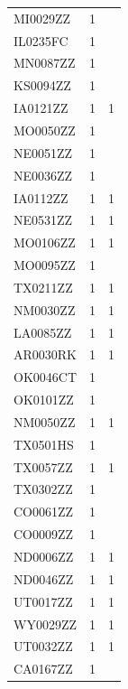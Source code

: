 \documentclass[12pt]{article}
\begin{document}
\begin{longtable}{lll}
MI0029ZZ         & 1             &          \\
IL0235FC         & 1             &          \\
MN0087ZZ         & 1             &          \\
KS0094ZZ         & 1             &          \\
IA0121ZZ         & 1             & 1        \\
MO0050ZZ         & 1             &          \\
NE0051ZZ         & 1             &          \\
NE0036ZZ         & 1             &          \\
IA0112ZZ         & 1             & 1        \\
NE0531ZZ         & 1             & 1        \\
MO0106ZZ         & 1             & 1        \\
MO0095ZZ         & 1             &          \\
TX0211ZZ         & 1             & 1        \\
NM0030ZZ         & 1             & 1        \\
LA0085ZZ         & 1             & 1        \\
AR0030RK         & 1             & 1        \\
OK0046CT         & 1             &          \\
OK0101ZZ         & 1             &          \\
NM0050ZZ         & 1             & 1        \\
TX0501HS         & 1             &          \\
TX0057ZZ         & 1             & 1        \\
TX0302ZZ         & 1             &          \\
CO0061ZZ         & 1             &          \\
CO0009ZZ         & 1             &          \\
ND0006ZZ         & 1             & 1        \\
ND0046ZZ         & 1             & 1        \\
UT0017ZZ         & 1             & 1        \\
WY0029ZZ         & 1             & 1        \\
UT0032ZZ         & 1             & 1        \\
CA0167ZZ         & 1             &          \\

\end{longtable}
\end{document}
